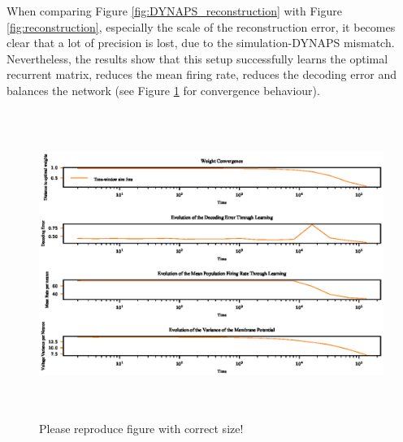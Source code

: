 \documentclass[twoside,11pt]{article}
\begin{document}
When comparing Figure \ref{fig:DYNAPS_reconstruction} with Figure \ref{fig:reconstruction},
especially the scale of the reconstruction error, it
becomes clear that a lot of precision is lost, due to the simulation-DYNAPS mismatch.
Nevertheless, the results show that this setup successfully learns the optimal recurrent matrix,
reduces the mean firing rate, reduces the decoding error and balances the network
(see Figure \ref{fig:DYNAPS_convergence} for convergence behaviour).

\begin{figure}[!htb]
  \centering
  \includegraphics[width = \columnwidth, height=10cm]{figures/DYNAPS_convergence.eps}
  \caption{Please reproduce figure with correct size!}
  \label{fig:DYNAPS_convergence}
\end{figure}

\newpage
\end{document}
